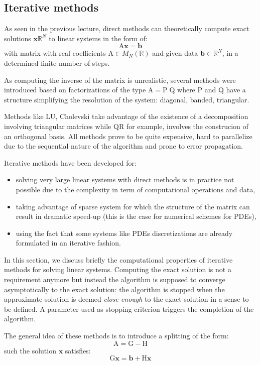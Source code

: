 \documentclass{article}
\newcommand{\xR}{\mathbb{R}}
\newcommand{\xRN}{{\xR^N}}
\newcommand{\xMNR}{{M_N(\xR)}}
\newcommand{\bb}{{\boldsymbol b}}
\newcommand{\xx}{{\boldsymbol x}}
\newcommand{\mA}{{\mathrm A}}
\newcommand{\mG}{{\mathrm G}}
\newcommand{\mH}{{\mathrm H}}
\newcommand{\mL}{{\mathrm L}}
\newcommand{\mR}{{\mathrm R}}
\newcommand{\mP}{{\mathrm P}}
\newcommand{\mQ}{{\mathrm Q}}
\newcommand{\mU}{{\mathrm U}}
\begin{document}
\subsection{Iterative methods}

As seen in the previous lecture, direct methods can theoretically compute exact solutions $\xx\xRN$ to linear systems in the form of:
\[
\mA \xx = \bb
\]
with matrix with real coefficients $\mA\in\xMNR$ and given data $\bb\in\xRN$, in a determined finite number of steps.

As computing the inverse of the matrix is unrealistic, several methods were introduced based on factorizations of the type $\mA = \mP\;\mQ$ where $\mP$ and $\mQ$ have a structure simplifying the resolution of the system: diagonal, banded, triangular.

Methods like $\mL\mU$, Cholevski take advantage of the existence of a decomposition involving triangular matrices while $\mQ\mR$ for example, involves the construcion of an orthogonal basis.
All methods prove to be quite expensive, hard to parallelize due to the sequential nature of the algorithm and prone to error propagation.

Iterative methods have been developed for:
\begin{itemize}
\item solving very large linear systems with direct methods is in practice not possible due to the complexity in term of computational operations and data,
\item taking advantage of sparse system for which the structure of the matrix can result in dramatic speed-up (this is the case for numerical schemes for PDEs),
\item using the fact that some systems like PDEs discretizations are already formulated in an iterative fashion.
\end{itemize}

\medskip
In this section, we discuss briefly the computational properties of iterative methods for solving linear systems.
Computing the exact solution is not a requirement anymore but instead the algorithm is supposed to converge asymptotically to the exact solution: the algorithm is stopped when the approximate solution is deemed \textit{close enough} to the exact solution in a sense to be defined.
A parameter used as stopping criterion triggers the completion of the algorithm.

\medskip
The general idea of these methods is to introduce a splitting of the form:
\[
\mA = \mG - \mH
\]
such the solution $\xx$ satisfies:
\[
\mG \xx = \bb + \mH \xx
\]
\end{document}
